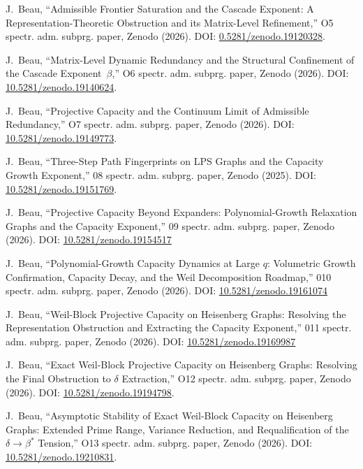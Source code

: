 J.~Beau,
``Admissible Frontier Saturation and the Cascade Exponent: A Representation-Theoretic Obstruction and its Matrix-Level
Refinement,''
O5 spectr. adm. subprg. paper, Zenodo (2026).
DOI: \href{https://doi.org/10.5281/zenodo.19120328}{0.5281/zenodo.19120328}.

J.~Beau,
``Matrix-Level Dynamic Redundancy and the Structural Confinement of the Cascade Exponent~$\beta$,''
O6 spectr. adm. subprg. paper, Zenodo (2026).
DOI: \href{https://doi.org/10.5281/zenodo.19140624}{10.5281/zenodo.19140624}.

J.~Beau,
``Projective Capacity and the Continuum Limit of Admissible Redundancy,''
O7 spectr. adm. subprg. paper, Zenodo (2026).
DOI: \href{https://doi.org/10.5281/zenodo.19149773}{10.5281/zenodo.19149773}.

J.~Beau,
``Three-Step Path Fingerprints on LPS Graphs and the Capacity Growth Exponent,''
08 spectr. adm. subprg. paper, Zenodo (2025).
DOI: \href{https://doi.org/10.5281/zenodo.19151769}{10.5281/zenodo.19151769}.

J.~Beau,
``Projective Capacity Beyond Expanders: Polynomial-Growth Relaxation Graphs and the Capacity Exponent,''
09 spectr. adm. subprg. paper, Zenodo (2026).
DOI: \href{https://doi.org/10.5281/zenodo.19154517}{10.5281/zenodo.19154517}

J.~Beau,
``Polynomial-Growth Capacity Dynamics at Large $q$: Volumetric Growth Confirmation, Capacity Decay, and the Weil
Decomposition Roadmap,''
010 spectr. adm. subprg. paper, Zenodo (2026).
DOI: \href{https://doi.org/10.5281/zenodo.19161074}{10.5281/zenodo.19161074}

J.~Beau,
``Weil-Block Projective Capacity on Heisenberg Graphs: Resolving the Representation Obstruction and Extracting the
Capacity Exponent,''
011 spectr. adm. subprg. paper, Zenodo (2026).
DOI: \href{https://doi.org/10.5281/zenodo.19169987}{10.5281/zenodo.19169987}

J.~Beau,
``Exact Weil-Block Projective Capacity on Heisenberg Graphs: Resolving the Final Obstruction to $\delta$ Extraction,''
O12 spectr. adm. subprg. paper, Zenodo (2026).
DOI: \href{https://doi.org/10.5281/zenodo.19194798}{10.5281/zenodo.19194798}.

J.~Beau,
``Asymptotic Stability of Exact Weil-Block Capacity on Heisenberg Graphs: Extended Prime Range, Variance Reduction,
and Requalification of the \(\delta \to \beta^*\) Tension,''
O13 spectr. adm. subprg. paper, Zenodo (2026).
DOI: \href{https://doi.org/10.5281/zenodo.19210831}{10.5281/zenodo.19210831}.


